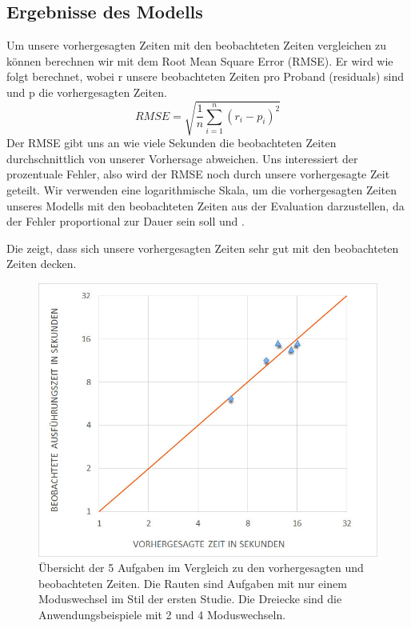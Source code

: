 \subsection{Ergebnisse des Modells}
Um unsere vorhergesagten Zeiten mit den beobachteten Zeiten vergleichen zu können berechnen wir mit dem Root Mean Square Error (RMSE). Er wird wie folgt berechnet, wobei r unsere beobachteten Zeiten pro Proband (residuals) sind und p die vorhergesagten Zeiten.
\[
RMSE = \sqrt{\frac{1}{n}\sum_{i=1}^{n}(r_i - p_i)^2}
\]
Der RMSE gibt uns an wie viele Sekunden die beobachteten Zeiten durchschnittlich von unserer Vorhersage abweichen. Uns interessiert der prozentuale Fehler, also wird der RMSE noch durch unsere vorhergesagte Zeit geteilt. Wir verwenden eine logarithmische Skala, um die vorhergesagten Zeiten unseres Modells mit den beobachteten Zeiten aus der Evaluation darzustellen, da der Fehler proportional zur Dauer sein soll \citep{Card_1980} und \citep{schneegass_2009}. 

Die  zeigt, dass sich unsere vorhergesagten Zeiten sehr gut mit den beobachteten Zeiten decken. 
\begin{figure}
	\centering
		\includegraphics[width=1\textwidth]{img/predictedVsObserveredData.jpg}
	\caption[Übersicht der 5 Aufgaben im Vergleich zu den vorhergesagten und beobachteten Zeiten]{Übersicht der 5 Aufgaben im Vergleich zu den vorhergesagten und beobachteten Zeiten. Die Rauten sind Aufgaben mit nur einem Moduswechsel im Stil der ersten Studie. Die Dreiecke sind die Anwendungsbeispiele mit 2 und 4 Moduswechseln.}
	\label{fig:predictedVsObserveredData}
\end{figure}

